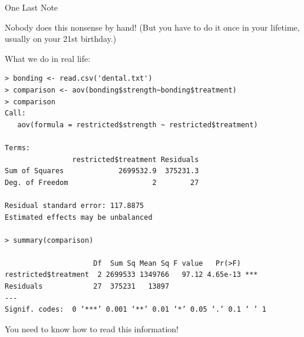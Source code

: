 \begin{frame}[fragile]{One Last Note}

  Nobody does this nonsense by hand! (But you have to do it once in
  your lifetime, usually on your 21st birthday.)

  What we do in real life:

 {
   \fontsize{5pt}{5pt}
   \selectfont

\begin{verbatim}
> bonding <- read.csv('dental.txt') 
> comparison <- aov(bonding$strength~bonding$treatment)
> comparison
Call:
   aov(formula = restricted$strength ~ restricted$treatment)

Terms:
                restricted$treatment Residuals
Sum of Squares             2699532.9  375231.3
Deg. of Freedom                    2        27

Residual standard error: 117.8875
Estimated effects may be unbalanced

> summary(comparison)

                     Df  Sum Sq Mean Sq F value   Pr(>F)    
restricted$treatment  2 2699533 1349766   97.12 4.65e-13 ***
Residuals            27  375231   13897                     
---
Signif. codes:  0 ‘***’ 0.001 ‘**’ 0.01 ‘*’ 0.05 ‘.’ 0.1 ‘ ’ 1
\end{verbatim}
}
 
  You need to know how to read this information!

 
\end{frame}

